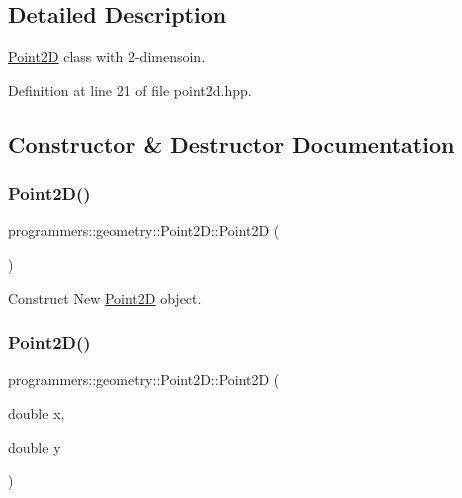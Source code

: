 \subsection{Detailed Description}
\hyperlink{classprogrammers_1_1geometry_1_1Point2D}{Point2D} class with 2-\/dimensoin. 

Definition at line 21 of file point2d.\+hpp.



\subsection{Constructor \& Destructor Documentation}
\mbox{\label{classprogrammers_1_1geometry_1_1Point2D_af4b2368f1cba27c5c1888a104c18c606}} 
\subsubsection{\texorpdfstring{Point2\+D()}{Point2D()}\hspace{0.1cm}{\footnotesize\ttfamily [1/4]}}
{\footnotesize\ttfamily programmers\+::geometry\+::\+Point2\+D\+::\+Point2D (\begin{DoxyParamCaption}{ }\end{DoxyParamCaption})\hspace{0.3cm}{\ttfamily [default]}}



Construct New \hyperlink{classprogrammers_1_1geometry_1_1Point2D}{Point2D} object. 

\mbox{\label{classprogrammers_1_1geometry_1_1Point2D_aec20eb5faef2545f78f6815d59d266e2}} 
\subsubsection{\texorpdfstring{Point2\+D()}{Point2D()}\hspace{0.1cm}{\footnotesize\ttfamily [2/4]}}
{\footnotesize\ttfamily programmers\+::geometry\+::\+Point2\+D\+::\+Point2D (\begin{DoxyParamCaption}\item[{double}]{x,  }\item[{double}]{y }\end{DoxyParamCaption})}



